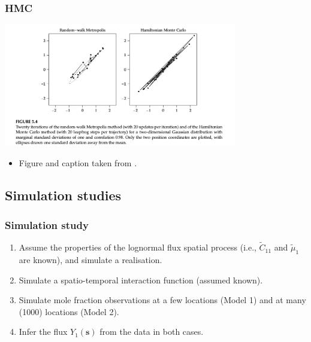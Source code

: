\documentclass{beamer}
\newcommand{\svec} {\textbf{s}}
\begin{document}
\begin{frame}
\frametitle{HMC}

\begin{center}
\includegraphics[width=4in]{HMC2.png}
\end{center}
\begin{itemize}
\item Figure and caption taken from \cite{Neal_2011}.
\end{itemize}
\end{frame}


\subsection{Simulation studies}


\begin{frame}
\frametitle{Simulation study}

\begin{enumerate}
\item Assume the properties of the lognormal flux spatial process (i.e., $\widetilde{C}_{11}$ and $\widetilde{\mu}_{1}$ are known), and simulate a realisation. \vfill
\item Simulate a spatio-temporal interaction function (assumed known).\vfill
\item Simulate mole fraction observations at a few locations (Model 1) and at many (1000) locations (Model 2).\vfill
\item Infer the flux $Y_1(\svec)$ from the data in both cases.\vfill
\end{enumerate}
\end{frame}
\end{document}
